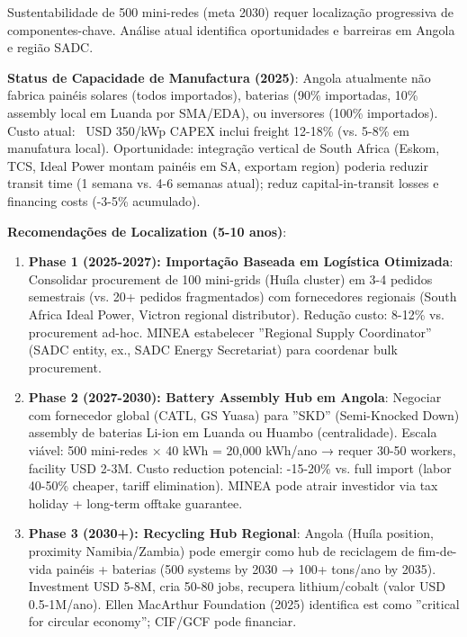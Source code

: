 \documentclass[12pt, a4paper]{article}
\begin{document}
Sustentabilidade de 500 mini-redes (meta 2030) requer localização progressiva de componentes-chave. Análise atual identifica oportunidades e barreiras em Angola e região SADC.

\textbf{Status de Capacidade de Manufactura (2025)}: Angola atualmente não fabrica painéis solares (todos importados), baterias (90\% importadas, 10\% assembly local em Luanda por SMA/EDA), ou inversores (100\% importados). Custo atual: ~USD 350/kWp CAPEX inclui freight 12-18\% (vs. 5-8\% em manufatura local). Oportunidade: integração vertical de South Africa (Eskom, TCS, Ideal Power montam painéis em SA, exportam region) poderia reduzir transit time (1 semana vs. 4-6 semanas atual); reduz capital-in-transit losses e financing costs (-3-5\% acumulado).

\textbf{Recomendações de Localization (5-10 anos)}:

\begin{enumerate}
\item \textbf{Phase 1 (2025-2027): Importação Baseada em Logística Otimizada}: Consolidar procurement de 100 mini-grids (Huíla cluster) em 3-4 pedidos semestrais (vs. 20+ pedidos fragmentados) com fornecedores regionais (South Africa Ideal Power, Victron regional distributor). Redução custo: 8-12\% vs. procurement ad-hoc. MINEA estabelecer ''Regional Supply Coordinator'' (SADC entity, ex., SADC Energy Secretariat) para coordenar bulk procurement.

\item \textbf{Phase 2 (2027-2030): Battery Assembly Hub em Angola}: Negociar com fornecedor global (CATL, GS Yuasa) para ''SKD'' (Semi-Knocked Down) assembly de baterias Li-ion em Luanda ou Huambo (centralidade). Escala viável: 500 mini-redes × 40 kWh = 20,000 kWh/ano → requer 30-50 workers, facility USD 2-3M. Custo reduction potencial: -15-20\% vs. full import (labor 40-50\% cheaper, tariff elimination). MINEA pode atrair investidor via tax holiday + long-term offtake guarantee.

\item \textbf{Phase 3 (2030+): Recycling Hub Regional}: Angola (Huíla position, proximity Namibia/Zambia) pode emergir como hub de reciclagem de fim-de-vida painéis + baterias (500 systems by 2030 → 100+ tons/ano by 2035). Investment USD 5-8M, cria 50-80 jobs, recupera lithium/cobalt (valor USD 0.5-1M/ano). Ellen MacArthur Foundation (2025) identifica est como ''critical for circular economy''; CIF/GCF pode financiar.
\end{enumerate}
\end{document}
